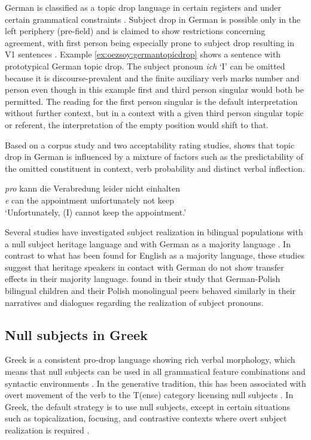 \documentclass[output=paper,colorlinks,citecolor=brown]{langscibook}
\begin{document}
German is classified as a topic drop language in certain registers and under certain grammatical constraints \parencite{fries1988ueber, trutkowski2016topic, schafer2021topic}. Subject drop in German is possible only in the left periphery (pre-field) and is claimed to show restrictions concerning agreement, with first person being especially prone to subject drop resulting in V1 sentences \parencite{schmitz2012null, trutkowski2016topic, schafer2021topic}. Example \ref{ex:oezsoy:germantopicdrop} shows a sentence with prototypical German topic drop. The subject pronoun \textit{ich} `I' can be omitted because it is discourse-prevalent and the finite auxiliary verb marks number and person even though in this example first and third person singular would both be permitted. The reading for the first person singular is the default interpretation without further context, but in a context with a given third person singular topic or referent, the interpretation of the empty position would shift to that.

Based on a corpus study and two acceptability rating studies, \textcite{schafer2021topic} shows that topic drop in German is influenced by a mixture of factors such as the predictability of the omitted constituent in context, verb probability and distinct verbal inflection. 

\ea \label{ex:oezsoy:germantopicdrop}
\gll \textit{pro} kann die Verabredung leider nicht einhalten\\ 
	\textit{e} can the appointment unfortunately  not keep\\
\glt `Unfortunately, (I) cannot keep the appointment.' \parencite[116]{schafer2021topic}
\z 
{}

Several studies have investigated subject realization in bilingual populations with a null subject heritage language and with German as a majority language \parencite{schmitz2012null, flores2020factors, brehmer2023same}. In contrast to what has been found for English as a majority language, these studies suggest that heritage speakers in contact with German do not show transfer effects in their majority language.
\textcite{brehmer2023same} found in their study that German-Polish bilingual children and their Polish monolingual peers behaved similarly in their narratives and dialogues regarding the realization of subject pronouns.
 
\subsection{Null subjects in Greek}
Greek is a consistent pro-drop language showing rich verbal morphology, which means that null subjects can be used in all grammatical feature combinations and syntactic environments \parencite{philippaki-warburton_1987, alexiadou1998parametrizing}.
In the generative tradition, this has been associated with overt movement of the verb to the T(ense) category licensing null subjects \parencite{alexiadou1998parametrizing}.
In Greek, the default strategy is to use null subjects, except in certain situations such as topicalization, focusing, and contrastive contexts where overt subject realization is required \parencite{TsimpliEtAl2004}.
\end{document}
